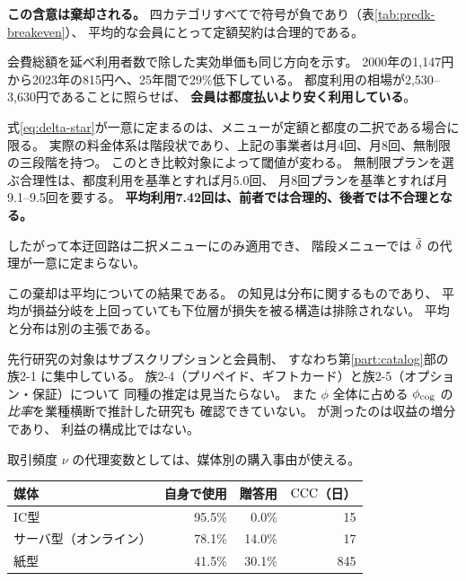 \textbf{この含意は棄却される。} 四カテゴリすべてで符号が負であり（表\ref{tab:predk-breakeven}）、
平均的な会員にとって定額契約は合理的である。

会費総額を延べ利用者数で除した実効単価も同じ方向を示す。
2000年の1,147円から2023年の815円へ、25年間で29\%低下している。
都度利用の相場が2,530--3,630円であることに照らせば、
\textbf{会員は都度払いより安く利用している}。

\begin{remark}[迂回路の適用条件]
\label{rem:detour-limit}
式\eqref{eq:delta-star}が一意に定まるのは、メニューが定額と都度の二択である場合に限る。
実際の料金体系は階段状であり、上記の事業者は月4回、月8回、無制限の三段階を持つ。
このとき比較対象によって閾値が変わる。
無制限プランを選ぶ合理性は、都度利用を基準とすれば月5.0回、
月8回プランを基準とすれば月9.1--9.5回を要する。
\textbf{平均利用7.42回は、前者では合理的、後者では不合理となる。}

したがって本迂回路は二択メニューにのみ適用でき、
階段メニューでは $\dbar$ の代理が一意に定まらない。
\end{remark}

\begin{remark}[本節から $\phi_{\rm cog}=0$ は導けない]
この棄却は平均についての結果である。
\cite{dellavigna2006} の知見は分布に関するものであり、
平均が損益分岐を上回っていても下位層が損失を被る構造は排除されない。
平均と分布は別の主張である。
\end{remark}

\begin{remark}[本稿の枠組みで残る未測定領域]
先行研究の対象はサブスクリプションと会員制、
すなわち第\ref{part:catalog}部の族2-1 に集中している。
族2-4（プリペイド、ギフトカード）と族2-5（オプション・保証）について
同種の推定は見当たらない。
また $\phi$ 全体に占める $\phi_{\rm cog}$ の\emph{比率}を業種横断で推計した研究も
確認できていない。\cite{einav2025} が測ったのは収益の増分であり、
利益の構成比ではない。
\end{remark}

取引頻度 $\nu$ の代理変数としては、媒体別の購入事由が使える。

\begin{center}
\begin{tabular}{@{}lrrr@{}}
\toprule
媒体 & 自身で使用 & 贈答用 & $\mathrm{CCC}$（日） \\
\midrule
IC型 & 95.5\% & 0.0\% & 15 \\
サーバ型（オンライン） & 78.1\% & 14.0\% & 17 \\
紙型 & 41.5\% & 30.1\% & 845 \\
\bottomrule
\end{tabular}
\label{tab:media-purchase-reason}
\end{center}

